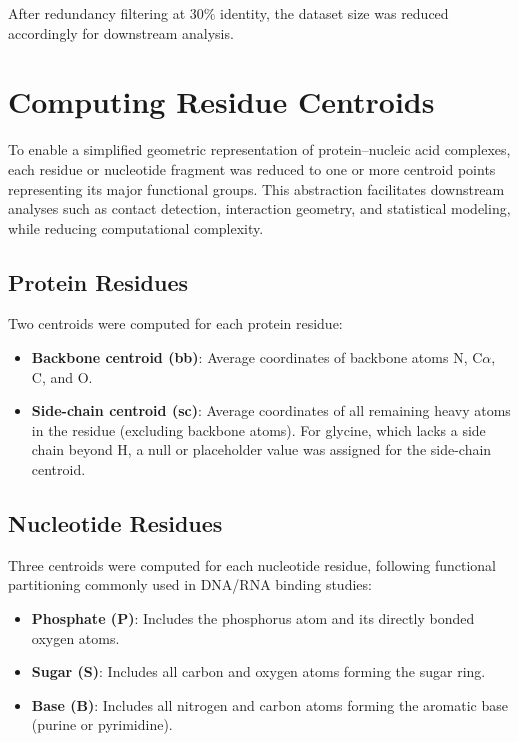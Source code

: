\documentclass[12pt,a4paper]{report}
\begin{document}
After redundancy filtering at $30\%$ identity, the dataset size was reduced accordingly for downstream analysis.


\newpage
\section*{Computing Residue Centroids}

To enable a simplified geometric representation of protein--nucleic acid complexes, each residue or nucleotide fragment was reduced to one or more centroid points representing its major functional groups. This abstraction facilitates downstream analyses such as contact detection, interaction geometry, and statistical modeling, while reducing computational complexity.

\subsection*{Protein Residues}
Two centroids were computed for each protein residue:
\begin{itemize}
    \item \textbf{Backbone centroid (bb)}: Average coordinates of backbone atoms N, C$\alpha$, C, and O.
    \item \textbf{Side-chain centroid (sc)}: Average coordinates of all remaining heavy atoms in the residue (excluding backbone atoms). For glycine, which lacks a side chain beyond H, a null or placeholder value was assigned for the side-chain centroid.
\end{itemize}

\subsection*{Nucleotide Residues}
Three centroids were computed for each nucleotide residue, following functional partitioning commonly used in DNA/RNA binding studies:
\begin{itemize}
    \item \textbf{Phosphate (P)}: Includes the phosphorus atom and its directly bonded oxygen atoms.
    \item \textbf{Sugar (S)}: Includes all carbon and oxygen atoms forming the sugar ring.
    \item \textbf{Base (B)}: Includes all nitrogen and carbon atoms forming the aromatic base (purine or pyrimidine).
\end{itemize}
\end{document}
